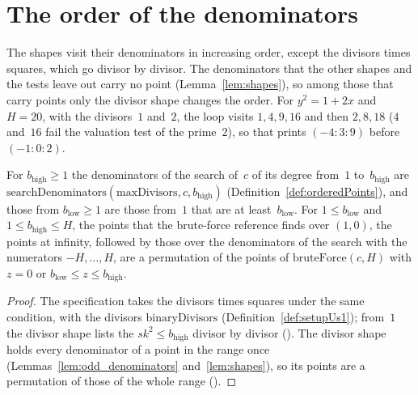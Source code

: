 \section{The order of the denominators}\label{sec:searchDens}

The shapes visit their denominators in increasing order, except the divisors times squares, which
go divisor by divisor. The denominators that the other shapes and the tests leave out carry no point
(Lemma~\ref{lem:shapes}), so among those that carry points only the divisor shape changes the
order. For $y^2 = 1 + 2x$ and $H = 20$, with the divisors~$1$ and~$2$, the loop visits
$1, 4, 9, 16$ and then $2, 8, 18$ ($4$ and~$16$ fail the valuation test of the prime~$2$), so that
\ratpoints{} prints $(-4 : 3 : 9)$ before $(-1 : 0 : 2)$.

\begin{lemma}\label{lem:searchDens}
  \leanok
  For $b_{\mathrm{high}} \ge 1$ the denominators of the search of~$c$ of its degree from~$1$
  to~$b_{\mathrm{high}}$ are
  $\mathrm{searchDenominators}(\mathrm{maxDivisors}, c, b_{\mathrm{high}})$
  (Definition~\ref{def:orderedPoints}), and those from $b_{\mathrm{low}} \ge 1$ are those from~$1$
  that are at least~$b_{\mathrm{low}}$. For $1 \le b_{\mathrm{low}}$ and
  $1 \le b_{\mathrm{high}} \le H$, the points that the brute-force reference finds over $(1, 0)$,
  the points at infinity, followed by those over the denominators of the search with the numerators
  $-H, \dots, H$, are a permutation of the points of $\mathrm{bruteForce}(c, H)$ with $z = 0$ or
  $b_{\mathrm{low}} \le z \le b_{\mathrm{high}}$.
\end{lemma}

\begin{proof}
  \leanok
  The specification takes the divisors times squares under the same condition, with the divisors
  $\mathrm{binaryDivisors}$ (Definition~\ref{def:setupUs1}); from~$1$ the divisor shape lists the
  $s k^2 \le b_{\mathrm{high}}$ divisor by divisor
  (). The divisor shape holds every
  denominator of a point in the range once (Lemmas~\ref{lem:odd_denominators}
  and~\ref{lem:shapes}), so its points are a permutation of those of the whole range
  ().
\end{proof}

